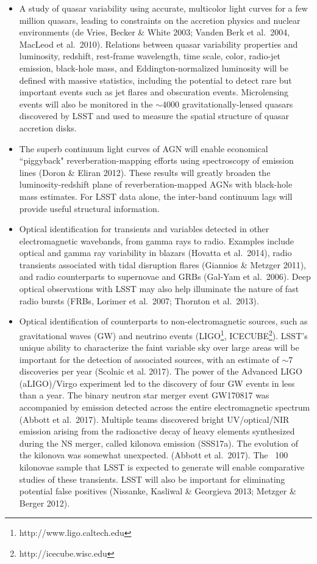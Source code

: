 \begin{itemize}
\item A study of quasar variability using accurate, multicolor light
  curves for a few million  
quasars, leading to constraints on the accretion physics and nuclear environments (de Vries, Becker 
\& White 2003; Vanden Berk et al.~2004, MacLeod et al.~2010). Relations between quasar variability 
      properties and luminosity, redshift, 
      rest-frame wavelength, time scale, color, radio-jet emission, black-hole 
      mass, and Eddington-normalized luminosity will be defined with massive
      statistics, including the potential to detect rare but important events such as 
      jet flares and obscuration events. Microlensing events will also be monitored in the $\sim$4000 gravitationally-lensed 
      quasars discovered by LSST and used to measure the spatial structure of quasar accretion disks.

\item The superb continuum light curves of AGN will enable economical ``piggyback" 
      reverberation-mapping efforts using spectroscopy of emission lines (Doron \& Eliran 2012). These results 
      will greatly broaden the luminosity-redshift plane of reverberation-mapped AGNs
      with black-hole mass estimates. For LSST data alone, the inter-band continuum lags 
      will provide useful structural information. 

\item Optical identification for transients and variables detected in
  other electromagnetic wavebands, from gamma rays to radio. Examples
  include optical and gamma ray variability in blazars (Hovatta et
  al.~2014), radio transients associated with tidal disruption flares
  (Giannios \& Metzger 2011), and radio counterparts to supernovae and
  GRBs (Gal-Yam et al.~2006). Deep optical observations with LSST may
  also help illuminate the nature of fast radio bursts (FRBs, Lorimer et al.~2007; Thornton et al.~2013).

\item Optical identification of counterparts to non-electromagnetic
  sources, such as gravitational waves (GW) and neutrino events
  (LIGO\footnote{http://www.ligo.caltech.edu},
  ICECUBE\footnote{http://icecube.wisc.edu}).  LSST’s unique ability
  to characterize the faint variable sky over large areas will be
  important for the detection of associated sources, with an estimate
  of $\sim 7$ discoveries per year (Scolnic et al. 2017).  The power
  of the Advanced LIGO (aLIGO)/Virgo experiment led to the discovery
  of four GW events in less than a year. The binary
  neutron star merger event GW170817 was accompanied by emission
  detected across the entire electromagnetic spectrum (Abbott et
  al.~2017). Multiple teams discovered bright UV/optical/NIR emission
  arising from the radioactive decay of heavy elements synthesized
  during the NS merger, called kilonova emission (SSS17a).  The
  evolution of the kilonova was somewhat unexpected.  (Abbott et
  al.~2017).  The ~100 kilonovae sample that LSST is expected to
  generate will enable comparative studies of these transients. LSST
  will also be important for eliminating potential false positives
  (Nissanke, Kasliwal \& Georgieva 2013; Metzger \& Berger 2012).


\end{itemize}
